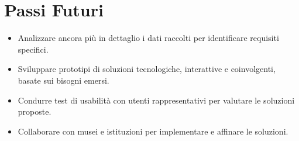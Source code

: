 \documentclass{article}
\begin{document}
\section{Passi Futuri}

\begin{itemize}
    \item Analizzare ancora più in dettaglio i dati raccolti per identificare requisiti specifici.
    \item Sviluppare prototipi di soluzioni tecnologiche, interattive e coinvolgenti, basate sui bisogni emersi.
    \item Condurre test di usabilità con utenti rappresentativi per valutare le soluzioni proposte.
    \item Collaborare con musei e istituzioni per implementare e affinare le soluzioni.
\end{itemize}
\end{document}
